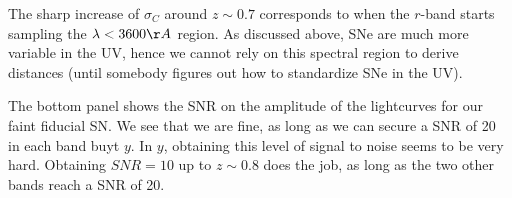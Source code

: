 \documentclass[\docopts]{\docclass}
\begin{document}
The sharp increase of $\sigma_C$ around $z \sim 0.7$ corresponds to
when the $r$-band starts sampling the $\lambda < 3600\AA$ region. As
discussed above, SNe are much more variable in the UV, hence we cannot
rely on this spectral region to derive distances (until somebody
figures out how to standardize SNe in the UV).

The bottom panel shows the SNR on the amplitude of the lightcurves for
our faint fiducial SN. We see that we are fine, as long as we can
secure a SNR of 20 in each band buyt $y$. In $y$, obtaining this level
of signal to noise seems to be very hard. Obtaining $SNR=10$ up to
$z\sim 0.8$ does the job, as long as the two other bands reach a SNR of 20. 


\begin{figure}
\begin{center}

\end{center}
\end{figure}
\end{document}
